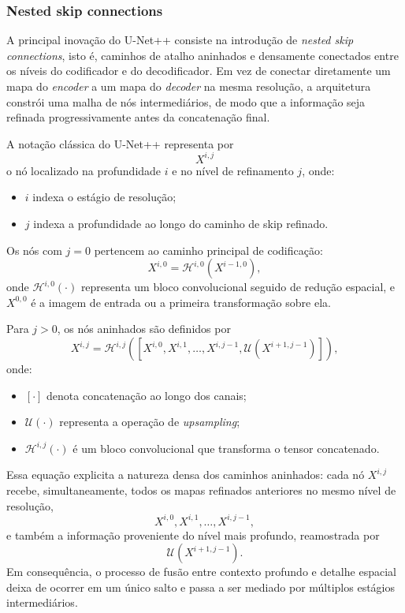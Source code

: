 \documentclass[tcc,capa]{texufpel}
\begin{document}
\subsubsection{Nested skip connections}

A principal inovação do U-Net++ consiste na introdução de \textit{nested skip connections}, isto é, caminhos de atalho aninhados e densamente conectados entre os níveis do codificador e do decodificador. Em vez de conectar diretamente um mapa do \textit{encoder} a um mapa do \textit{decoder} na mesma resolução, a arquitetura constrói uma malha de nós intermediários, de modo que a informação seja refinada progressivamente antes da concatenação final.

A notação clássica do U-Net++ representa por
\begin{equation}
	X^{i,j}
\end{equation}
o nó localizado na profundidade \(i\) e no nível de refinamento \(j\), onde:
\begin{itemize}
	\item \(i\) indexa o estágio de resolução;
	\item \(j\) indexa a profundidade ao longo do caminho de skip refinado.
\end{itemize}
Os nós com \(j=0\) pertencem ao caminho principal de codificação:
\begin{equation}
	X^{i,0} = \mathcal{H}^{i,0}(X^{i-1,0}),
\end{equation}
onde \(\mathcal{H}^{i,0}(\cdot)\) representa um bloco convolucional seguido de redução espacial, e \(X^{0,0}\) é a imagem de entrada ou a primeira transformação sobre ela.

Para \(j > 0\), os nós aninhados são definidos por
\begin{equation}
	X^{i,j}
	=
	\mathcal{H}^{i,j}
	\left(
	\left[
	X^{i,0},
	X^{i,1},
	\dots,
	X^{i,j-1},
	\mathcal{U}(X^{i+1,j-1})
	\right]
	\right),
\end{equation}
onde:
\begin{itemize}
	\item \([\cdot]\) denota concatenação ao longo dos canais;
	\item \(\mathcal{U}(\cdot)\) representa a operação de \textit{upsampling};
	\item \(\mathcal{H}^{i,j}(\cdot)\) é um bloco convolucional que transforma o tensor concatenado.
\end{itemize}

Essa equação explicita a natureza densa dos caminhos aninhados: cada nó \(X^{i,j}\) recebe, simultaneamente, todos os mapas refinados anteriores no mesmo nível de resolução,
\begin{equation}
	X^{i,0}, X^{i,1}, \dots, X^{i,j-1},
\end{equation}
e também a informação proveniente do nível mais profundo, reamostrada por
\begin{equation}
	\mathcal{U}(X^{i+1,j-1}).
\end{equation}
Em consequência, o processo de fusão entre contexto profundo e detalhe espacial deixa de ocorrer em um único salto e passa a ser mediado por múltiplos estágios intermediários.
\end{document}

